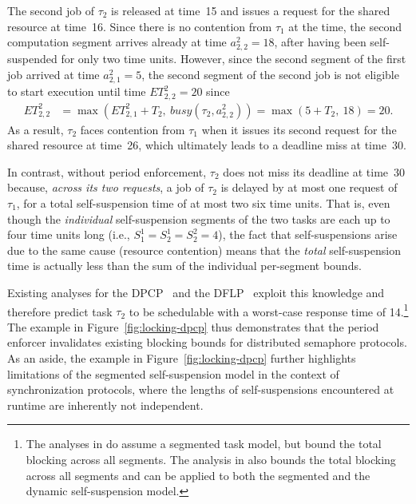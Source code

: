 The second job of $\tau_2$ is released at time~15 and issues a request for the shared resource at time~16. Since there is no contention from $\tau_1$ at the time, the second computation segment arrives already at time $a^2_{2,2} = 18$, after having been self-suspended for only two time units. However, since the second segment of the first job arrived at time $a^2_{2,1} = 5$, the second segment of the second job is not eligible to start execution until time $ET_{2,2}^2 = 20$ since 
\begin{align*}
	ET_{2,2}^2 & = \max\left(ET_{2,1}^2 + T_2,\ \mathit{busy}(\tau_2, a^2_{2,2})\right) =\max(5 + T_2,\ 18) = 20.
\end{align*}
As a result, $\tau_2$ faces contention from $\tau_1$ when it issues its second request for the shared resource at time~26, which ultimately leads to a deadline miss at time~30.

In contrast, without period enforcement, $\tau_2$ does not miss its deadline at time~30 because, \emph{across its two requests}, a job of $\tau_2$ is delayed by at most one request of $\tau_1$, for a total self-suspension time of at most two six time units. That is, even though the \emph{individual} self-suspension segments of the two tasks are each up to four time units long (i.e., $S_1^1 = S_2^1 = S_2^2 = 4$), the fact that self-suspensions arise due to the same cause (resource contention) means that the \emph{total} self-suspension time is actually less than the sum of the individual per-segment bounds.

 Existing analyses for the DPCP~\cite{RSL:88,Raj:91,Br:13} and the DFLP~\cite{Br:13} exploit this knowledge and therefore predict task $\tau_2$ to be schedulable with a worst-case response time of 14.\footnote{The analyses in \cite{RSL:88,Raj:91} do assume a segmented task model, but bound the total blocking across all segments. The analysis in \cite{Br:13} also bounds the total blocking across all segments and can be applied to both the segmented and the dynamic self-suspension model.} The example in Figure~\ref{fig:locking-dpcp} thus demonstrates that the period enforcer invalidates existing blocking bounds for distributed semaphore protocols. As an aside, the example in Figure~\ref{fig:locking-dpcp} further highlights limitations of the segmented self-suspension model in the context of synchronization protocols, where the lengths of self-suspensions encountered at runtime are inherently not independent.


